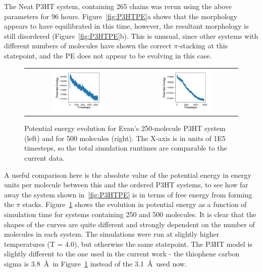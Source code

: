 \documentclass[12pt]{article}
\begin{document}
The Neat P3HT system, containing 265 chains was rerun using the above parameters for 96 hours.
Figure~\ref{fig:P3HTPE}a shows that the morphology appears to have equilibrated in this time, however, the resultant morphology is still disordered (Figure~\ref{fig:P3HTPE}b).
This is unusual, since other systems with different numbers of molecules have shown the correct $\pi$-stacking at this statepoint, and the PE does not appear to be evolving in this case.


\begin{figure}[h!]\centering
    \begin{tabular}{cc}
        \includegraphics[width=0.5\textwidth]{Figures/P3HT250.pdf}&
	    \includegraphics[width=0.5\textwidth]{Figures/P3HT500.pdf}
    \end{tabular}
    \caption{Potential energy evolution for Evan's 250-molecule P3HT system (left) and for 500 molecules (right).
    The X-axis is in units of 1E5 timesteps, so the total simulation runtimes are comparable to the current data.}
	\label{fig:P3HTPEs}
\end{figure}


A useful comparison here is the absolute value of the potential energy in energy units per molecule between this and the ordered P3HT systems, to see how far away the system shown in~\ref{fig:P3HTPE} is in terms of free energy from forming the $\pi$ stacks.
Figure~\ref{fig:P3HTPEs} shows the evolution in potential energy as a function of simulation time for systems containing 250 and 500 molecules.
It is clear that the shapes of the curves are quite different and strongly dependent on the number of molecules in each system.
The simulations were run at slightly higher temperatures (T = 4.0), but otherwise the same statepoint.
The P3HT model is slightly different to the one used in the current work - the thiophene carbon sigma is 3.8~\AA~in Figure~\ref{fig:P3HTPEs} instead of the 3.1~\AA~used now.
\end{document}
